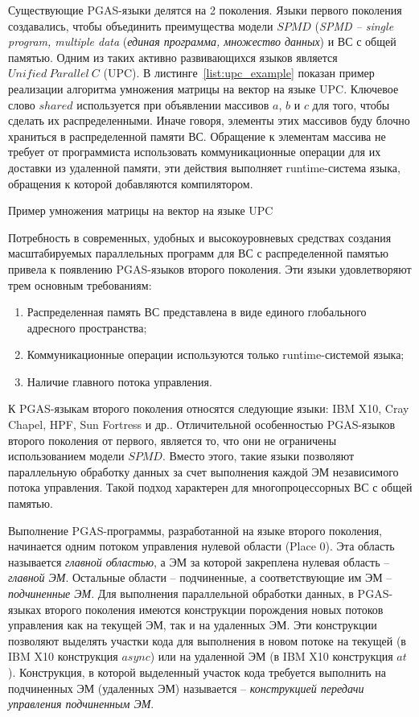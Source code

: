 Существующие PGAS-языки делятся на 2 поколения. Языки первого поколения создавались, чтобы объединить преимущества модели $SPMD$ (\textit{SPMD -- single program, multiple data} (\textit{единая программа, множество данных}) и ВС с общей памятью. Одним из таких активно развивающихся языков является $Unified\ Parallel\ C$ (UPC). В листинге~\ref{list:upc_example} показан пример реализации алгоритма умножения матрицы на вектор на языке UPC. Ключевое слово $shared$ используется при объявлении массивов $a$, $b$ и $c$ для того, чтобы сделать их распределенными. Иначе говоря, элементы этих массивов буду блочно храниться в распределенной памяти ВС. Обращение к элементам массива не требует от программиста использовать коммуникационные операции для их доставки из удаленной памяти, эти действия выполняет runtime-система языка, обращения к которой добавляются компилятором.

\begin{ListingEnv}[ht]
	\small {}
    \caption{Пример умножения матрицы на вектор на языке UPC}
    \label{list:upc_example}
\end{ListingEnv}
Потребность в современных, удобных и высокоуровневых средствах создания масштабируемых параллельных программ для ВС с распределенной памятью привела к появлению PGAS-языков второго поколения. Эти языки удовлетворяют трем основным требованиям:
\begin{enumerate}
\item Распределенная память ВС представлена в виде единого глобального адресного пространства;
\item Коммуникационные операции используются только runtime-системой языка;
\item Наличие главного потока управления.
\end{enumerate}

К PGAS-языкам второго поколения относятся следующие языки: IBM X10, Cray Chapel, HPF, Sun Fortress и др.. Отличительной особенностью PGAS-языков второго поколения от первого, является то, что они не ограничены использованием модели $SPMD$. Вместо этого, такие языки позволяют параллельную обработку данных за счет выполнения каждой ЭМ независимого потока управления. Такой подход характерен для многопроцессорных ВС с общей памятью.

Выполнение PGAS-программы, разработанной на языке второго поколения, начинается одним потоком управления нулевой области (Place 0). Эта область называется \textit{главной областью}, а ЭМ за которой закреплена нулевая область -- \textit{главной ЭМ}. Остальные области -- подчиненные, а соответствующие им ЭМ -- \textit{подчиненные ЭМ}. Для выполнения параллельной обработки данных, в PGAS-языках второго поколения имеются конструкции порождения новых потоков управления как на текущей ЭМ, так и на удаленных ЭМ. Эти конструкции позволяют выделять участки кода для выполнения в новом потоке на текущей (в IBM X10 конструкция $async$) или на удаленной ЭМ (в IBM X10 конструкция $at$). Конструкция, в которой выделенный участок кода требуется выполнить на подчиненных ЭМ (удаленных ЭМ) называется -- \textit{конструкцией передачи управления подчиненным ЭМ}. 

